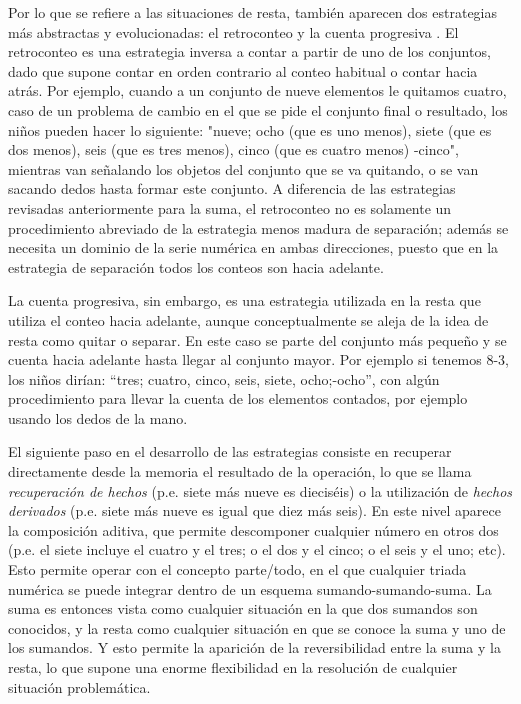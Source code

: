 \documentclass{article}
\begin{document}
Por lo que se refiere a las situaciones de resta, también aparecen dos estrategias más abstractas y evolucionadas: el retroconteo y la cuenta progresiva \cite{fuson1996levels}. El retroconteo es una estrategia inversa a contar a partir de uno de los conjuntos, dado que supone contar en orden contrario al conteo habitual o contar hacia atrás. Por ejemplo, cuando a un conjunto de nueve elementos le quitamos cuatro, caso de un problema de cambio en el que se pide el conjunto final o resultado, los niños pueden hacer lo siguiente: "nueve; ocho (que es uno menos), siete (que es dos menos), seis (que es tres menos), cinco (que es cuatro menos) -cinco", mientras van señalando los objetos del conjunto que se va quitando, o se van sacando dedos hasta formar este conjunto. A diferencia de las estrategias revisadas anteriormente para la suma, el retroconteo no es solamente un procedimiento abreviado de la estrategia menos madura de separación; además se necesita un dominio de la serie numérica en ambas direcciones, puesto que en la estrategia de separación todos los conteos son hacia adelante.

La cuenta progresiva, sin embargo, es una estrategia utilizada en la resta que utiliza el conteo hacia adelante, aunque conceptualmente se aleja de la idea de resta como quitar o separar. En este caso se parte del conjunto más pequeño y se cuenta hacia adelante hasta llegar al conjunto mayor. Por ejemplo si tenemos 8-3, los niños dirían: “tres; cuatro, cinco, seis, siete, ocho;-ocho”, con algún procedimiento para llevar la cuenta de los elementos contados, por ejemplo usando los dedos de la mano.

El siguiente paso en el desarrollo de las estrategias consiste en recuperar directamente desde la memoria el resultado de la operación, lo que se llama \emph{recuperación de hechos} (p.e. siete más nueve es dieciséis) o la utilización de \emph{hechos derivados} (p.e. siete más nueve es igual que diez más seis). En este nivel aparece la composición aditiva, que permite descomponer cualquier número en otros dos (p.e. el siete incluye el cuatro y el tres; o el dos y el cinco; o el seis y el uno; etc). Esto permite operar con el concepto parte/todo, en el que cualquier triada numérica se puede integrar dentro de un esquema sumando-sumando-suma. La suma es entonces vista como cualquier situación en la que dos sumandos son conocidos, y la resta como cualquier situación en que se conoce la suma y uno de los sumandos. Y esto permite la aparición de la reversibilidad entre la suma y la resta, lo que supone una enorme flexibilidad en la resolución de cualquier situación problemática.
\end{document}
